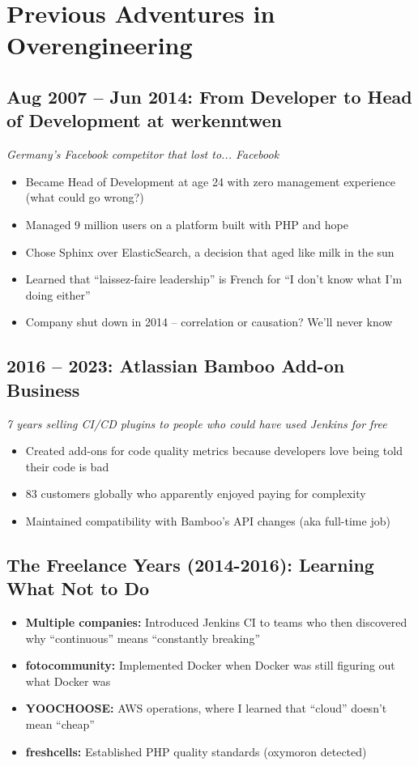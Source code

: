 \documentclass[10pt,a4paper]{article}
\begin{document}
\newpage

\section*{Previous Adventures in Overengineering}

\subsection*{Aug 2007 -- Jun 2014: From Developer to Head of Development at werkenntwen}
\textit{Germany's Facebook competitor that lost to... Facebook}
\begin{itemize}
\item Became Head of Development at age 24 with zero management experience (what could go wrong?)
\item Managed 9 million users on a platform built with PHP and hope
\item Chose Sphinx over ElasticSearch, a decision that aged like milk in the sun
\item Learned that ``laissez-faire leadership'' is French for ``I don't know what I'm doing either''
\item Company shut down in 2014 -- correlation or causation? We'll never know
\end{itemize}

\subsection*{2016 -- 2023: Atlassian Bamboo Add-on Business}
\textit{7 years selling CI/CD plugins to people who could have used Jenkins for free}
\begin{itemize}
\item Created add-ons for code quality metrics because developers love being told their code is bad
\item 83 customers globally who apparently enjoyed paying for complexity
\item Maintained compatibility with Bamboo's API changes (aka full-time job)
\end{itemize}

\subsection*{The Freelance Years (2014-2016): Learning What Not to Do}
\begin{itemize}
\item \textbf{Multiple companies:} Introduced Jenkins CI to teams who then discovered why ``continuous'' means ``constantly breaking''
\item \textbf{fotocommunity:} Implemented Docker when Docker was still figuring out what Docker was
\item \textbf{YOOCHOOSE:} AWS operations, where I learned that ``cloud'' doesn't mean ``cheap''
\item \textbf{freshcells:} Established PHP quality standards (oxymoron detected)
\end{itemize}
\end{document}
